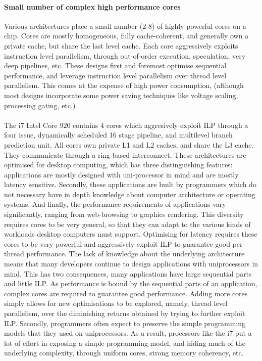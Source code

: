 \paragraph{Small number of complex high performance cores}
Various architectures place a small number (2-8) of highly
powerful cores on a chip.  Cores are mostly homogeneous, fully cache-coherent,
and generally own a private cache, but share the last level cache. 
Each core aggressively exploits instruction level parallelism, through
out-of-order execution, speculation, very deep pipelines, etc. 
These designs first and foremost optimise sequential performance, 
and leverage instruction level parallelism over thread level parallelism. 
This comes at the expense of high power consumption, 
(although most designs incorporate some power
saving techniques like voltage scaling, processing gating, etc.)
\paragraph{} The i7 Intel Core 920 contains 4 cores which aggresively
exploit ILP through a four issue,  dynamically scheduled 16 stage pipeline,
and multilevel branch prediction unit. All cores own
 private L1 and L2 caches, and share the L3 cache. They communicate
through a ring based interconnect. These architectures are
optimised for desktop computing, which has three distinguishing features:
applications are mostly designed with uni-processor in mind and are 
mostly latency sensitive. Secondly, these applications are built by 
programmers which do not necessary have in depth knowledge about computer
 architecture or operating systems. And finally, the performance requirements
of applications vary significantly, ranging from web-browsing
to graphics rendering.  This diversity requires cores to be very general,
so that they can adapt to the various kinds of workloads desktop computers
must support. Optimising for latency requires these cores to be very powerful 
and aggressively exploit ILP to guarantee good per
thread performance. The lack of knowledge about the underlying architecture
means that many developers continue to design applications with uniprocessors
in mind. This has two consequences, many applications have large sequential parts and 
little ILP. As performance is bound by the sequential parts of an application, 
complex cores are required to guarantee good performance. 
Adding more cores simply allows for new optimisations to be explored, namely, 
thread level parallelism, over the diminishing returns obtained by trying
to further exploit ILP.  Secondly, programmers often expect to preserve the 
simple programming models that they used
on uniprocessors. As a result, processors like the i7 put a lot of effort in exposing
a simple programming model, and hiding much of the underlying complexity, through
uniform cores, strong memory coherency, etc. 



